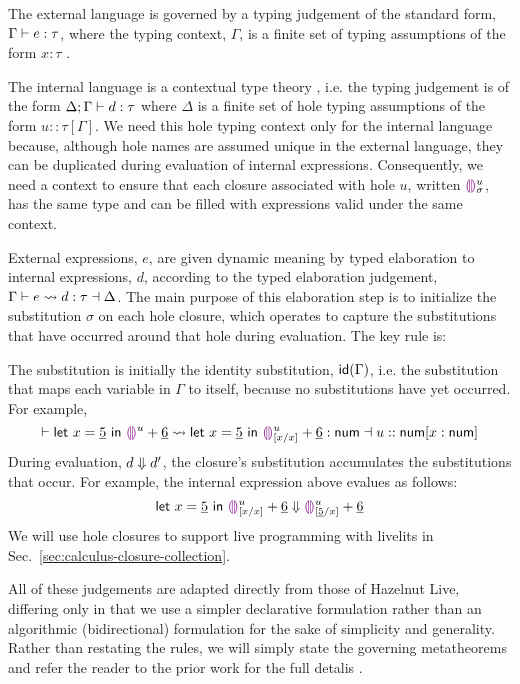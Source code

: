 The external language is governed by a typing judgement of the standard form, $\hasType{\Gamma}{e}{\tau}$, 
where the typing context, $\Gamma$,
is a finite set of typing assumptions of the form $x : \tau$ \cite{pfpl}.

The internal language is a contextual type theory \cite{Nanevski2008}, i.e. the typing judgement is 
of the form $\hasTypeD{\Delta}{\Gamma}{d}{\tau}$ where $\Delta$ is a finite set of hole typing
assumptions of the form $u :: \tau[\Gamma]$.
We need this hole typing context only for the internal language because, although hole names are assumed 
unique in the external language, they can be duplicated during evaluation of internal expressions.
Consequently, we need a context to ensure that each closure associated with hole $u$, written $\dehole{u}{\sigma}$, 
has the same type and can be filled 
with expressions valid under the same context.

External expressions, $e$, are given dynamic meaning by typed elaboration to internal expressions, $d$, 
according to the typed elaboration judgement, $\elabs{\Gamma}{e}{d}{\tau}{\Delta}$.
The main purpose of this elaboration step is to initialize the substitution $\sigma$ on each hole closure, 
which operates to capture 
the substitutions that have occurred around that hole during evaluation. The key rule is:
\begin{mathpar}
\end{mathpar}
The substitution is initially the identity substitution, $\idof{\Gamma}$, i.e. the
substitution that maps each variable in $\Gamma$ to itself, because no substitutions have yet occurred. For example, 
\[ \elabs{ }{\helet{x}{\hnum{5}}{\hehole{u}} + \hnum{6}}{\helet{x}{\hnum{5}}{\dehole{u}{[x/x]} + \hnum{6}}}{\tnum}{u :: \tnum[x : \tnum]} \]
During evaluation, $\evalsTo{d}{d'}$, the closure's substitution accumulates the substitutions that occur. For example,
the internal expression above evalues as follows:
\[
  \evalsTo{\helet{x}{\hnum{5}}{\dehole{u}{[x/x]} + \hnum{6}}}{
      \dehole{u}{[\hnum{5}/x]} + \hnum{6}
  }
\]
We will use hole closures to support live programming with livelits in Sec.~\ref{sec:calculus-closure-collection}.


All of these judgements are adapted directly from those of Hazelnut Live, 
differing only in that we use a simpler declarative formulation rather than an algorithmic (bidirectional)
formulation for the sake of simplicity and generality. Rather than restating the rules, we will simply state the governing
metatheorems and refer the reader to the prior work for the full detalis \cite{HazelnutLive}.

